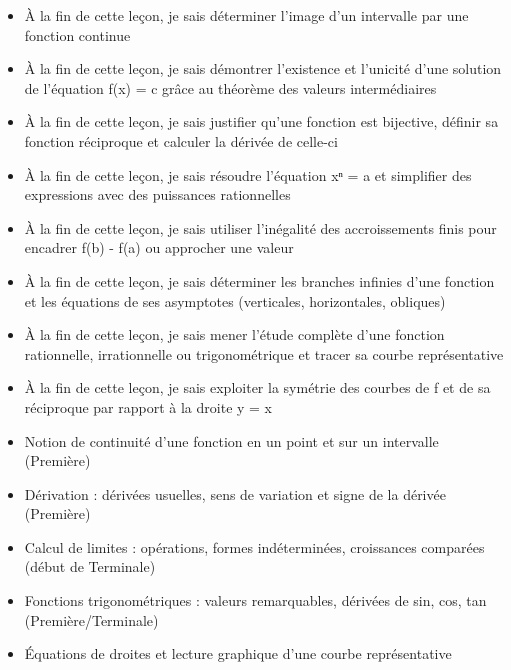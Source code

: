 \documentclass[11pt]{article}
\begin{document}
\begin{objectifs}
\begin{itemize}
\item À la fin de cette leçon, je sais déterminer l'image d'un intervalle par une fonction continue
\item À la fin de cette leçon, je sais démontrer l'existence et l'unicité d'une solution de l'équation f(x) = c grâce au théorème des valeurs intermédiaires
\item À la fin de cette leçon, je sais justifier qu'une fonction est bijective, définir sa fonction réciproque et calculer la dérivée de celle-ci
\item À la fin de cette leçon, je sais résoudre l'équation xⁿ = a et simplifier des expressions avec des puissances rationnelles
\item À la fin de cette leçon, je sais utiliser l'inégalité des accroissements finis pour encadrer f(b) - f(a) ou approcher une valeur
\item À la fin de cette leçon, je sais déterminer les branches infinies d'une fonction et les équations de ses asymptotes (verticales, horizontales, obliques)
\item À la fin de cette leçon, je sais mener l'étude complète d'une fonction rationnelle, irrationnelle ou trigonométrique et tracer sa courbe représentative
\item À la fin de cette leçon, je sais exploiter la symétrie des courbes de f et de sa réciproque par rapport à la droite y = x
\end{itemize}
\end{objectifs}

\begin{prerequis}
\begin{itemize}
\item Notion de continuité d'une fonction en un point et sur un intervalle (Première)
\item Dérivation : dérivées usuelles, sens de variation et signe de la dérivée (Première)
\item Calcul de limites : opérations, formes indéterminées, croissances comparées (début de Terminale)
\item Fonctions trigonométriques : valeurs remarquables, dérivées de sin, cos, tan (Première/Terminale)
\item Équations de droites et lecture graphique d'une courbe représentative
\end{itemize}
\end{prerequis}
\end{document}
